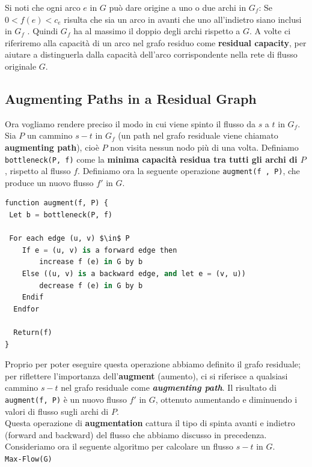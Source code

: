 Si noti che ogni arco $e$ in $G$ può dare origine a uno o due archi
in $G_f$: Se $0 < f (e) < c_e$ risulta che sia un arco in avanti
che uno all'indietro siano inclusi in $G_f$ . Quindi $G_f$ ha al
massimo il doppio degli archi rispetto a $G$. A volte ci riferiremo
alla capacità di un arco nel grafo residuo come \textbf{residual
  capacity}, per aiutare a distinguerla dalla capacità dell'arco
corrispondente nella rete di flusso originale $G$.


\subsection{Augmenting Paths in a Residual Graph}

Ora vogliamo rendere preciso il modo in cui viene spinto il flusso da
$s$ a $t$ in $G_f$. Sia $P$ un cammino $s-t$ in $G_f$ (un
path nel grafo residuale viene chiamato \textbf{augmenting path}), cioè
$P$ non visita nessun nodo più di una volta. Definiamo
\texttt{bottleneck(P,\ f)} come la \textbf{minima capacità residua tra
  tutti gli archi di $P$}, rispetto al flusso $f$. Definiamo ora la
seguente operazione \texttt{augment(f\ ,\ P)}, che produce un nuovo
flusso $f'$ in $G$.

\begin{lstlisting}[language=Python, mathescape=true]
function augment(f, P) {
 Let b = bottleneck(P, f)

 For each edge (u, v) $\in$ P
    If e = (u, v) is a forward edge then
    	increase f (e) in G by b
  	Else ((u, v) is a backward edge, and let e = (v, u))
    	decrease f (e) in G by b
  	Endif
  Endfor

  Return(f)
}
\end{lstlisting}

Proprio per poter eseguire questa operazione abbiamo definito il grafo
residuale; per riflettere l'importanza dell'\textbf{augment} (aumento),
ci si riferisce a qualsiasi cammino $s-t$ nel grafo residuale come
\textbf{\emph{augmenting path}}. Il risultato di
\texttt{augment(f,\ P)} è un nuovo flusso $f'$ in $G$, ottenuto
aumentando e diminuendo i valori di flusso sugli archi di $P$.\\

Questa operazione di \textbf{augmentation} cattura il tipo di spinta
avanti e indietro (forward and backward) del flusso che abbiamo discusso
in precedenza. Consideriamo ora il seguente algoritmo per calcolare un
flusso $s-t$ in $G$.\\

\texttt{Max-Flow(G)}

